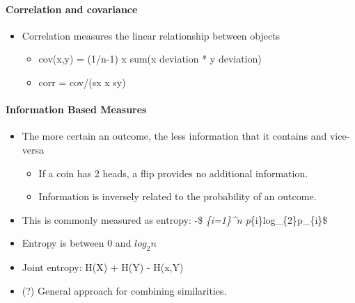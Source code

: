 \documentclass[11pt]{article}
\providecommand{\tightlist}{%
      \setlength{\itemsep}{0pt}\setlength{\parskip}{0pt}}
\begin{document}
    \paragraph{Correlation and covariance}\label{correlation-and-covariance}

    \begin{itemize}
\tightlist
\item
  Correlation measures the linear relationship between objects

  \begin{itemize}
  \tightlist
  \item
    cov(x,y) = (1/n-1) x sum(x deviation * y deviation)
  \item
    corr = cov/(sx x sy)
  \end{itemize}
\end{itemize}

    \paragraph{Information Based Measures}\label{information-based-measures}

    \begin{itemize}
\tightlist
\item
  The more certain an outcome, the less information that it contains and
  vice-versa

  \begin{itemize}
  \tightlist
  \item
    If a coin has 2 heads, a flip provides no additional information.
  \item
    Information is inversely related to the probability of an outcome.
  \end{itemize}
\end{itemize}

    \begin{itemize}
\tightlist
\item
  This is commonly measured as entropy: -\$ \sum\emph{\{i=1\}\^{}n
  p}\{i\}log\_\{2\}p\_\{i\}\$
\item
  Entropy is between 0 and \(log_{2}n\)
\item
  Joint entropy: H(X) + H(Y) - H(x,Y)
\end{itemize}

    \begin{itemize}
\tightlist
\item
  (?) General approach for combining similarities.
\end{itemize}
\end{document}
